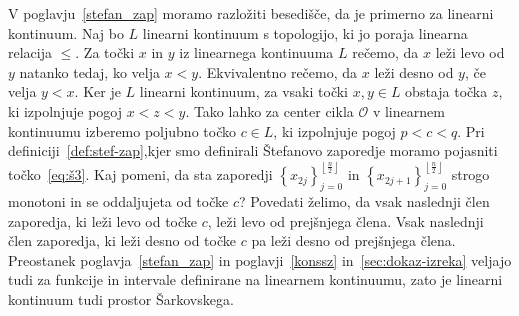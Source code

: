 \documentclass[../TG_magistrsko_delo_sections.tex]{subfiles}
\begin{document}
V poglavju~\ref{stefan_zap} moramo razložiti besedišče, da je primerno za linearni kontinuum. Naj bo $L$ linearni kontinuum s topologijo, ki jo poraja linearna relacija $\leq$. Za točki $x$ in $y$ iz linearnega kontinuuma $L$ rečemo, da $x$ leži levo od $y$ natanko tedaj, ko velja $x<y$. Ekvivalentno rečemo, da $x$ leži desno od $y$, če velja $y<x$. Ker je $L$ linearni kontinuum, za vsaki točki $x, y \in L$ obstaja točka $z$, ki izpolnjuje pogoj $x<z<y$. Tako lahko za center cikla $\mathcal{O}$ v linearnem kontinuumu izberemo poljubno točko $c \in L$, ki izpolnjuje pogoj $p< c <q$. Pri definiciji~\ref{def:stef-zap},kjer smo definirali Štefanovo zaporedje moramo pojasniti točko~\ref{eq:š3}. Kaj pomeni, da sta zaporedji 
$\left \{ x_{2j} \right \}_{j=0}^{\left \lfloor \frac{n}{2} \right \rfloor}$ 
    in
$\left \{ x_{2j+1} \right \}_{j=0}^{\left \lfloor \frac{n}{2} \right \rfloor}$
 strogo monotoni in se oddaljujeta od točke $c$?
Povedati želimo, da vsak naslednji člen zaporedja, ki leži levo od točke $c$, leži levo od prejšnjega člena. Vsak naslednji člen zaporedja, ki leži desno od točke $c$ pa leži desno od prejšnjega člena. Preostanek poglavja~\ref{stefan_zap} in poglavji~\ref{konssz} in~\ref{sec:dokaz-izreka} veljajo tudi za funkcije in intervale definirane na linearnem kontinuumu, zato je linearni kontinuum tudi prostor Šarkovskega.
\end{document}
